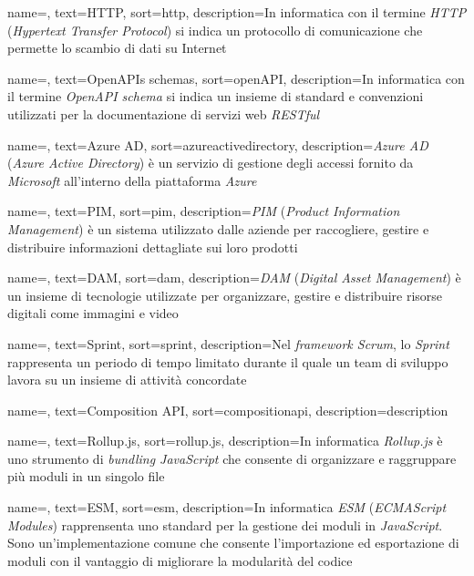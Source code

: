  {
    name=,
    text=HTTP,
    sort=http,
    description={In informatica con il termine \emph{HTTP} (\emph{Hypertext Transfer Protocol}) si indica un protocollo di comunicazione che permette lo scambio di dati su Internet}
}

 {
    name=,
    text=OpenAPIs schemas,
    sort=openAPI,
    description={In informatica con il termine \emph{OpenAPI schema} si indica un insieme di standard e convenzioni utilizzati per la documentazione di servizi web \emph{RESTful}}
}

 {
    name=,
    text=Azure AD,
    sort=azureactivedirectory,
    description={\emph{Azure AD} (\emph{Azure Active Directory}) è un servizio di gestione degli accessi fornito da \emph{Microsoft} all'interno della piattaforma \emph{Azure}}
}

 {
    name=,
    text=PIM,
    sort=pim,
    description={\emph{PIM} (\emph{Product Information Management}) è un sistema utilizzato dalle aziende per raccogliere, gestire e distribuire informazioni dettagliate sui loro prodotti}
}

 {
    name=,
    text=DAM,
    sort=dam,
    description={\emph{DAM} (\emph{Digital Asset Management}) è un insieme di tecnologie utilizzate per organizzare, gestire e distribuire risorse digitali come immagini e video}
}


 {
    name=,
    text=Sprint,
    sort=sprint,
    description={Nel \emph{framework Scrum}, lo \emph{Sprint} rappresenta un periodo di tempo limitato durante il quale un team di sviluppo lavora su un insieme di attività concordate}
}

 {
    name=,
    text=Composition API,
    sort=compositionapi,
    description={description}
}

 {
    name=,
    text=Rollup.js,
    sort=rollup.js,
    description={In informatica \emph{Rollup.js} è uno strumento di \emph{bundling JavaScript} che consente di organizzare e raggruppare più moduli in un singolo file}
}

 {
    name=,
    text=ESM,
    sort=esm,
    description={In informatica \emph{ESM} (\emph{ECMAScript Modules}) rapprensenta uno standard per la gestione dei moduli in \emph{JavaScript}. Sono un'implementazione comune che consente l'importazione
    ed esportazione di moduli con il vantaggio di migliorare la modularità del codice}
}

